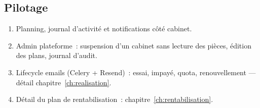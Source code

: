 \subsection{Pilotage}
\begin{enumerate}[leftmargin=*,label=\arabic*.]
  \item Planning, journal d'activité et notifications côté cabinet.
  \item Admin plateforme~: suspension d'un cabinet sans lecture des pièces, édition des plans, journal d'audit.
  \item Lifecycle emails (Celery + Resend)~: essai, impayé, quota, renouvellement --- détail chapitre~\ref{ch:realisation}.
  \item Détail du plan de rentabilisation~: chapitre~\ref{ch:rentabilisation}.
\end{enumerate}
